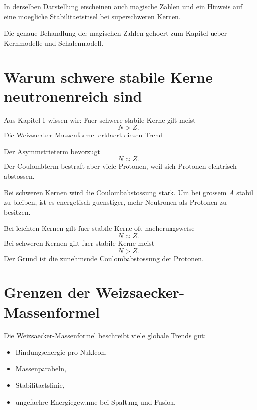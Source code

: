\begin{notebox}
In derselben Darstellung erscheinen auch magische Zahlen und ein Hinweis auf eine
moegliche Stabilitaetsinsel bei superschweren Kernen.

Die genaue Behandlung der magischen Zahlen gehoert zum Kapitel ueber Kernmodelle und
Schalenmodell.
\end{notebox}

\section{Warum schwere stabile Kerne neutronenreich sind}

Aus Kapitel 1 wissen wir:
Fuer schwere stabile Kerne gilt meist
\[
    N>Z.
\]
Die Weizsaecker-Massenformel erklaert diesen Trend.

\begin{conceptbox}
Der Asymmetrieterm bevorzugt
\[
    N\approx Z.
\]
Der Coulombterm bestraft aber viele Protonen, weil sich Protonen elektrisch abstossen.

Bei schweren Kernen wird die Coulombabstossung stark.
Um bei grossem $A$ stabil zu bleiben, ist es energetisch guenstiger, mehr Neutronen
als Protonen zu besitzen.
\end{conceptbox}

\begin{examtipbox}
Bei leichten Kernen gilt fuer stabile Kerne oft naeherungsweise
\[
    N\approx Z.
\]
Bei schweren Kernen gilt fuer stabile Kerne meist
\[
    N>Z.
\]
Der Grund ist die zunehmende Coulombabstossung der Protonen.
\end{examtipbox}

\section{Grenzen der Weizsaecker-Massenformel}

\begin{conceptbox}
Die Weizsaecker-Massenformel beschreibt viele globale Trends gut:
\begin{itemize}
    \item Bindungsenergie pro Nukleon,
    \item Massenparabeln,
    \item Stabilitaetslinie,
    \item ungefaehre Energiegewinne bei Spaltung und Fusion.
\end{itemize}
\end{conceptbox}

